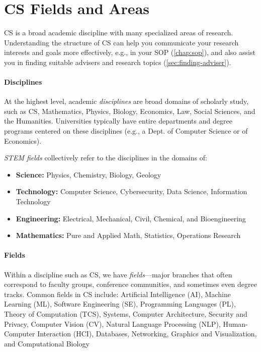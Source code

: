 \documentclass[oneside,11pt]{book}
\newenvironment{commentbox}[1][]{
  \small
  \begin{marker}[\faChessPawn{}]
    {\textbf{#1}}
  }{
  \end{marker}
}
\begin{document}
\section{CS Fields and Areas}\label{sec:fields-and-areas}

CS is a broad academic discipline with many specialized areas of research. Understanding the structure of CS can help you communicate your research interests and goals more effectively, e.g., in your SOP (\autoref{chap:sop}), and also assist you in finding suitable advisers and research topics (\autoref{sec:finding-adviser}).

\paragraph{Disciplines} At the highest level, academic \emph{disciplines} are broad domains of scholarly study, such as CS, Mathematics, Physics, Biology, Economics, Law, Social Sciences, and the Humanities. Universities typically have entire departments and degree programs centered on these disciplines (e.g., a Dept. of Computer Science or of Economics).

\begin{commentbox}

\emph{STEM fields} collectively refer to the disciplines in the domains of:
\begin{itemize}
    \item \textbf{Science:} Physics, Chemistry, Biology, Geology
    \item \textbf{Technology:} Computer Science, Cybersecurity, Data Science, Information Technology
    \item \textbf{Engineering:} Electrical, Mechanical, Civil, Chemical, and Bioengineering
    \item \textbf{Mathematics:} Pure and Applied Math, Statistics, Operations Research
\end{itemize}
\end{commentbox}

\paragraph{Fields} Within a discipline such as CS, we have \emph{fields}---major branches that often correspond to faculty groups, conference communities, and sometimes even degree tracks. Common fields in CS include:
Artificial Intelligence (AI),
Machine Learning (ML),
Software Engineering (SE),
Programming Languages (PL),
Theory of Computation (TCS),
Systems,
Computer Architecture,
Security and Privacy,
Computer Vision (CV),
Natural Language Processing (NLP),
Human-Computer Interaction (HCI),
Databases,
Networking,
Graphics and Visualization,
and Computational Biology
\end{document}
